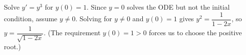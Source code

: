 {Solve $y' = y^3$ for $y(0)=1$.}
{Since $y=0$ solves the ODE but not the initial condition, assume $y\neq 0$. Solving for $y\neq 0$ and $y(0)=1$ gives $y^2 = \dfrac{1}{1-2x}$, so $y = \dfrac{1}{\sqrt{1-2x}}$. (The requirement $y(0)=1>0$ forces us to choose the positive root.)}